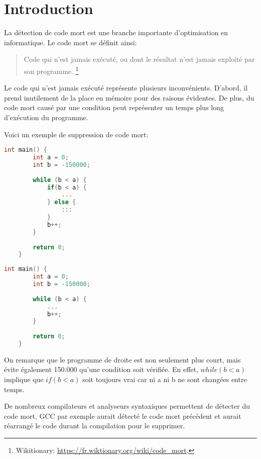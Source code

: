 \section{Introduction}
La détection de code mort est une branche importante d'optimisation en informatique. Le code mort se définit ainsi:
\begin{quotation}
    Code qui n'est jamais exécuté, ou dont le résultat n'est jamais exploité par son programme.
    \footnote{Wikitionary: \url{https://fr.wiktionary.org/wiki/code_mort}.}
\end{quotation}
Le code qui n'est jamais exécuté représente plusieurs inconvénients. D'abord, il prend inutilement de la place en mémoire pour des raisons évidentes. De plus, du code mort causé par une condition peut représenter un temps plus long d'exécution du programme.

Voici un exemple de suppression de code mort:
\begin{multicols}{2}
\begin{lstlisting}[language=c]
    int main() {
        int a = 0;
        int b = -150000;
        
        while (b < a) {
            if(b < a) {
                ...
            } else {
                :::
            }
            b++;
        }
    
        return 0;
    }
\end{lstlisting}
\columnbreak
\begin{lstlisting}[language=c]
    int main() {
        int a = 0;
        int b = -150000;
        
        while (b < a) {
            ...
            b++;
        }
    
        return 0;
    }
\end{lstlisting}
\end{multicols}
\begin{center}
\end{center}

On remarque que le programme de droite est non seulement plus court, mais évite également 150.000 qu'une condition soit vérifiée. En effet, $while (b < a)$ implique que $if (b < a)$ soit toujours vrai car ni a ni b ne sont changées entre temps. 

De nombreux compilateurs et analyseurs syntaxiques permettent de détecter du code mort, GCC par exemple aurait détecté le code mort précédent et aurait réarrangé le code durant la compilation pour le supprimer.

